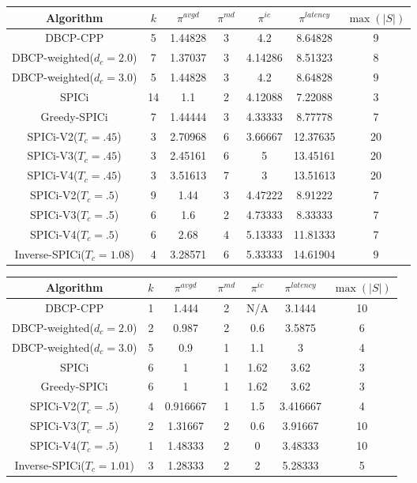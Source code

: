 \documentclass{article}
\begin{document}
	\begin{table}
		\begin{center}
			\begin{tabular}{|c|c|c|c|c|c|c|}
				\hline
				\textbf{Algorithm} & \textbf{$k$} & $\pi^{avgd}$ & \textbf{$\pi^{md}$} & \textbf{$\pi^{ic}$} & \textbf{$\pi^{latency}$} & \textbf{$\max(|S|)$} \\
				\hline
				DBCP-CPP & 5 & 1.44828 & 3 & 4.2 & 8.64828 & 9 \\
				DBCP-weighted($d_c=2.0$) & 7 & 1.37037 & 3 & 4.14286 &  8.51323 & 8 \\
				DBCP-weighted($d_c=3.0$) & 5 & 1.44828 & 3 & 4.2 & 8.64828 & 9 \\
				SPICi & 14 & 1.1 & 2 & 4.12088 & 7.22088 & 3 \\
				Greedy-SPICi & 7 & 1.44444 & 3 & 4.33333 & 8.77778 & 7  \\
				SPICi-V2($T_c=.45$) & 3 & 2.70968 & 6 & 3.66667 & 12.37635 & 20 \\
				SPICi-V3($T_c=.45$) & 3 & 2.45161 & 6 & 5 & 13.45161 & 20 \\
				SPICi-V4($T_c=.45$) & 3 & 3.51613 & 7 & 3 & 13.51613 & 20 \\
				SPICi-V2($T_c=.5$) & 9 & 1.44 & 3 & 4.47222 & 8.91222 & 7 \\
				SPICi-V3($T_c=.$5) & 6 & 1.6 & 2 & 4.73333 & 8.33333 & 7 \\
				SPICi-V4($T_c=.5$) & 6 & 2.68 & 4 & 5.13333 & 11.81333 & 7 \\
				Inverse-SPICi($T_c=1.08$) & 4 & 3.28571 & 6 & 5.33333 & 14.61904 & 9 \\
				\hline
			\end{tabular}
		\end{center}
	\end{table}
	\begin{table}
		\begin{center}
			\begin{tabular}{|c|c|c|c|c|c|c|}
				\hline
				\textbf{Algorithm} & \textbf{$k$} & $\pi^{avgd}$ & \textbf{$\pi^{md}$} & \textbf{$\pi^{ic}$} & \textbf{$\pi^{latency}$} & \textbf{$\max(|S|)$} \\
				\hline
				DBCP-CPP & 1 & 1.444 & 2 & N/A & 3.1444 & 10 \\
				DBCP-weighted($d_c=2.0$) & 2 & 0.987 & 2 & 0.6 & 3.5875 & 6 \\
				DBCP-weighted($d_c=3.0$) & 5 & 0.9 & 1 & 1.1 & 3 & 4 \\
				SPICi & 6 & 1 & 1 & 1.62 & 3.62 & 3 \\
				Greedy-SPICi & 6 & 1 & 1 & 1.62 & 3.62 & 3 \\
				SPICi-V2($T_c=.5$) & 4 & 0.916667 & 1 & 1.5 & 3.416667 & 4 \\
				SPICi-V3($T_c=.5$) & 2 & 1.31667 & 2 & 0.6 & 3.91667 & 10 \\
				SPICi-V4($T_c=.5$) & 1 & 1.48333 & 2 & 0 & 3.48333 & 10 \\
				Inverse-SPICi($T_c=1.01$) & 3 & 1.28333 & 2 & 2 & 5.28333 & 5 \\
				\hline
			\end{tabular}
		\end{center}
	\end{table}
\end{document}
